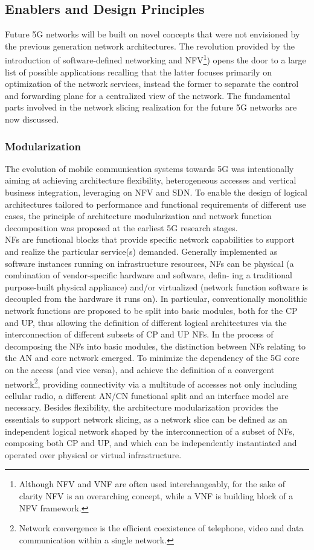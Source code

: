 \documentclass{article}
\begin{document}
\subsection{Enablers and Design Principles}
Future 5G networks will be built on novel concepts that were not envisioned by the previous generation
network architectures. The revolution provided by the introduction of software-defined networking
and \gls{NFV}\footnote{Although NFV and VNF are often used interchangeably, for the sake of clarity NFV is an overarching concept, while a VNF is building block of a NFV framework.}) opens the door to a
large list of possible applications recalling that the latter focuses primarily on optimization of the network services, instead the former to separate the control and forwarding plane for a centralized view of the network. The fundamental parts involved in the network slicing realization for the future 5G networks are now discussed.

\subsubsection{Modularization}
The evolution of mobile communication systems towards 5G was intentionally aiming at achieving
architecture flexibility, heterogeneous accesses and vertical business integration, leveraging on NFV and SDN. To enable the design of logical architectures tailored to
performance and functional requirements of different use cases, the principle of architecture
modularization and network function decomposition was proposed at the earliest 5G research
stages.\\ 
\gls{NF}s are functional blocks
that provide specific network capabilities to support and realize the particular service(s) demanded. Generally implemented
as software instances running on infrastructure
resources, NFs can be physical (a combination
of vendor-specific hardware and software, defin-
ing a traditional purpose-built physical appliance)
and/or virtualized (network function software is
decoupled from the hardware it runs on). In particular, conventionally monolithic network functions are proposed to be split into basic modules, both for the \gls{CP} and \gls{UP}, thus allowing the definition of different logical architectures via the interconnection of
different subsets of CP and UP NFs.
In the process of decomposing the NFs into basic modules, the distinction between NFs relating to
the \gls{AN} and core network emerged. To minimize the dependency of the 5G
core on the access (and vice versa), and achieve the definition of a convergent network\footnote{Network convergence is the efficient coexistence of telephone, video and data communication within a single network.}, providing
connectivity via a multitude of accesses not only including cellular radio, a different AN/CN functional split and an interface model are necessary.
Besides flexibility, the architecture modularization provides the essentials to support network
­slicing, as a network slice can be defined as an independent logical network shaped by the interconnection of a subset of NFs, composing both CP and UP, and which can be independently instantiated
and operated over physical or virtual infrastructure.
\end{document}
